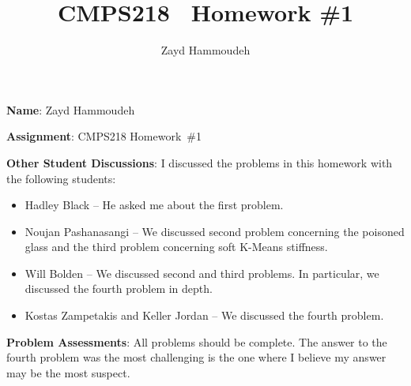 \documentclass{report}
\title{\textbf{CMPS218 \textendash\ Homework \#1}}
\author{Zayd Hammoudeh}
\begin{document}
  \maketitle

  \textbf{Name}: Zayd Hammoudeh

  \textbf{Assignment}:  CMPS218 Homework~\#1

  \textbf{Other Student Discussions}: I discussed the problems in this homework with the following students:
  \vspace{-3em}
  \begin{itemize}[leftmargin=1.35cm]
    \setlength\itemsep{0em}
    \item Hadley Black -- He asked me about the first problem.

    \item Noujan Pashanasangi -- We discussed second problem concerning the poisoned glass and the third problem concerning soft K-Means stiffness.

    \item Will Bolden -- We discussed second and third problems.  In particular, we discussed the fourth problem in depth.

    \item Kostas Zampetakis and Keller Jordan -- We discussed the fourth problem.
  \end{itemize}

  \textbf{Problem Assessments}: All problems should be complete.  The answer to the fourth problem was the most challenging is the one where I believe my answer may be the most suspect.

  

  

  

  
\end{document}
